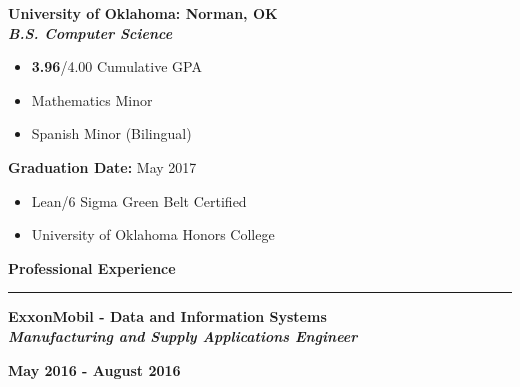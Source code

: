 \documentclass[10pt,letterpaper]{article}
\begin{document}
\begin{minipage}[t]{0.5\textwidth}
	\begin{flushleft}
		\textbf{University of Oklahoma: Norman, OK}\\
		\textbf{\textit{B.S. Computer Science}}
		
		\begin{itemize}[noitemsep,topsep=0pt]
			\setlength\itemsep{-0.10em}
			\item \textbf{3.96}/4.00 Cumulative GPA
			\item Mathematics Minor
			\item Spanish Minor (Bilingual)
		\end{itemize}
		
	\end{flushleft}
\end{minipage}
\begin{minipage}[t]{0.47\textwidth}
	\begin{flushright}
		\textbf{Graduation Date:} May 2017
		
		\begin{itemize}[noitemsep,topsep=14pt]
			\item Lean/6 Sigma Green Belt Certified
			\item University of Oklahoma Honors College
		\end{itemize}
		
	\end{flushright}
\end{minipage}

\medskip

\begin{large}
	\textbf{Professional Experience}
\end{large}

\smallskip \hrule \smallskip

\begin{minipage}[t]{0.53\textwidth}
	\begin{flushleft}
		\textbf{ExxonMobil - Data and Information Systems}\\
		\textbf{\textit{Manufacturing and Supply Applications Engineer}}\\
	\end{flushleft}
\end{minipage}
\begin{minipage}[t]{0.44\textwidth}
	\begin{flushright}
		\textbf{May 2016 - August 2016}
	\end{flushright}
\end{minipage}
\end{document}
